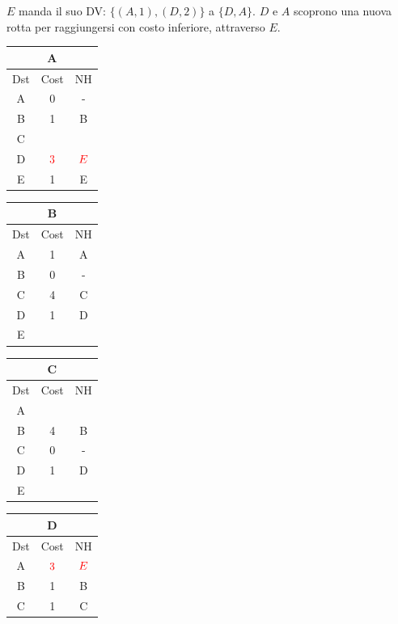 \documentclass[10pt]{article}
\begin{document}
			\newline \newline
			$E$ manda il suo DV: $\{(A,1),(D,2)\}$ a $\{D,A\}$.
			\newline
			$D$ e $A$ scoprono una nuova rotta per raggiungersi con costo inferiore, attraverso $E$.
			\begin{table}[h!]
				\begin{tabular}{|c||c||c|}
					\hline
					\multicolumn{3}{|c|}{A} \\
					\hline
					Dst & Cost & NH \\
					\hline
					A & 0 & - \\
					B & 1 & B \\
					C &   &   \\
					D & $\color{red} 3$ & $\color{red} E$ \\
					E & 1 & E \\
					\hline
				\end{tabular}
				\begin{tabular}{|c||c||c|}
					\hline
					\multicolumn{3}{|c|}{B} \\
					\hline
					Dst & Cost & NH \\
					\hline
					A & 1 & A \\
					B & 0 & - \\
					C & 4 & C  \\
					D & 1 & D \\
					E &   &   \\
					\hline
				\end{tabular}
				\begin{tabular}{|c||c||c|}
					\hline
					\multicolumn{3}{|c|}{C} \\
					\hline
					Dst & Cost & NH \\
					\hline
					A &   &   \\
					B & 4 & B \\
					C & 0 & - \\
					D & 1 & D \\
					E &   &   \\
					\hline
				\end{tabular}
				\begin{tabular}{|c||c||c|}
					\hline
					\multicolumn{3}{|c|}{D} \\
					\hline
					Dst & Cost & NH \\
					\hline
					A & $\color{red} 3$ & $\color{red} E$ \\
					B & 1 & B \\
					C & 1 & C \\

\end{tabular}
\end{table}
\end{document}
